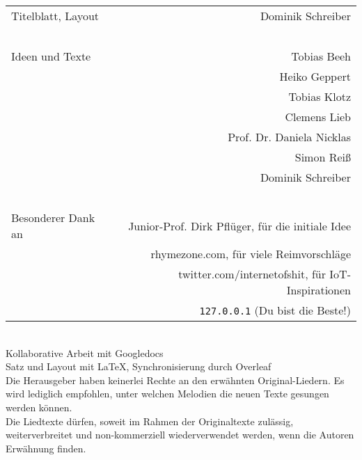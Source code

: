 \documentclass[11pt,a5paper]{article}
\begin{document}
	
	\begin{tabularx}{\columnwidth}{Xr}
		Titelblatt, Layout &  Dominik Schreiber \\
		\ \\
		Ideen und Texte  & Tobias Beeh \\
		  & Heiko Geppert \\
		  & Tobias Klotz \\
		  & Clemens Lieb \\
		  & Prof. Dr. Daniela Nicklas \\
		  & Simon Reiß \\
		  & Dominik Schreiber \\
		\ \\
		Besonderer Dank an & Junior-Prof. Dirk Pflüger, für die initiale Idee \\
		  & rhymezone.com, für viele Reimvorschläge \\
		  & twitter.com/internetofshit, für IoT-Inspirationen \\
		  & \texttt{127.0.0.1} (Du bist die Beste!) \\
	\end{tabularx}
	
	\ \\
	
	Kollaborative Arbeit mit Googledocs \\
	Satz und Layout mit \LaTeX , Synchronisierung durch Overleaf \\
	
	Die Herausgeber haben keinerlei Rechte an den erwähnten Original-Liedern. Es wird lediglich empfohlen, unter welchen Melodien die neuen Texte gesungen werden können. \\
	
	Die Liedtexte dürfen, soweit im Rahmen der Originaltexte zulässig, weiterverbreitet und non-kommerziell wiederverwendet werden, wenn die Autoren Erwähnung finden.
	
\end{document}
